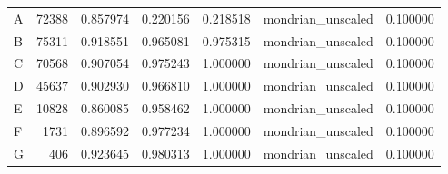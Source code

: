 \begin{tabular}{lrrrrlr}
A & 72388 & 0.857974 & 0.220156 & 0.218518 & mondrian_unscaled & 0.100000 \\
B & 75311 & 0.918551 & 0.965081 & 0.975315 & mondrian_unscaled & 0.100000 \\
C & 70568 & 0.907054 & 0.975243 & 1.000000 & mondrian_unscaled & 0.100000 \\
D & 45637 & 0.902930 & 0.966810 & 1.000000 & mondrian_unscaled & 0.100000 \\
E & 10828 & 0.860085 & 0.958462 & 1.000000 & mondrian_unscaled & 0.100000 \\
F & 1731 & 0.896592 & 0.977234 & 1.000000 & mondrian_unscaled & 0.100000 \\
G & 406 & 0.923645 & 0.980313 & 1.000000 & mondrian_unscaled & 0.100000 \\
\bottomrule
\end{tabular}

